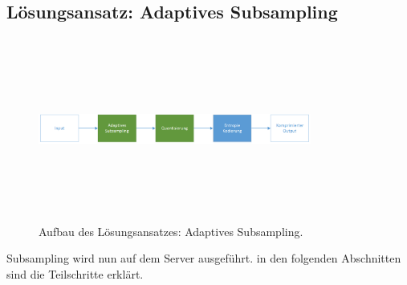 \subsection{Lösungsansatz: Adaptives Subsampling}
\begin{figure}[!htbp]
	\center
	\includegraphics[width=0.8\textwidth,height=6cm,keepaspectratio]{./pictures/konzept/solution0/aufbau.png}
	\caption{Aufbau des Lösungsansatzes: Adaptives Subsampling.}
	\label{konzept:loesung0:aufbau:diagramm}
\end{figure} 
Subsampling wird nun auf dem Server ausgeführt. in den folgenden Abschnitten sind die Teilschritte erklärt.


